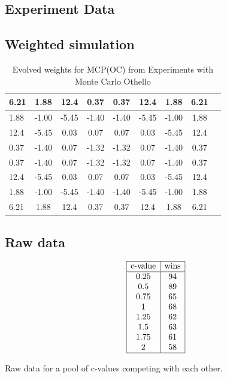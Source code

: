 \documentclass[
11pt, %
english, %
singlespacing, %
headsepline, %
]{MastersDoctoralThesis} %
\begin{document}
\printbibliography
\begin{appendices}
\chapter{Experiment Data}
\section{Weighted simulation}

\begin{table}[H]
	\centering
	\begin{tabular}{|l|c|c|c|c|c|c|c|c|}
		\hline
		6.21 &  1.88 &  12.4 &  0.37 &  0.37 & 12.4  &  1.88 & 6.21 \\
		\hline
		1.88 & -1.00 & -5.45 & -1.40 & -1.40 & -5.45 & -1.00 & 1.88 \\
		\hline
		12.4 & -5.45 &  0.03 &  0.07 &  0.07 &  0.03 & -5.45 & 12.4 \\
		\hline
		0.37 & -1.40 &  0.07 & -1.32 & -1.32 &  0.07 & -1.40 & 0.37 \\
		\hline
		0.37 & -1.40 &  0.07 & -1.32 & -1.32 &  0.07 & -1.40 & 0.37 \\
		\hline
		12.4 & -5.45 &  0.03 &  0.07 &  0.07 &  0.03 & -5.45 & 12.4 \\
		\hline
		1.88 & -1.00 & -5.45 & -1.40 & -1.40 & -5.45 & -1.00 & 1.88 \\
		\hline
		6.21 &  1.88 & 12.4  &  0.37 &  0.37 & 12.4  &  1.88 & 6.21 \\
		\hline
	\end{tabular}
	\caption{Evolved weights for MCP(OC) from Experiments with Monte Carlo Othello\cite{hingston2007experiments}}
	\label{table:othello-weights}
\end{table}

\section{Raw data}
\begin{table}[H]
\[
\begin{array}{|c|c|}
    \hline
    \text{c-value} & \text{wins}\\
    \hline
	0.25 & 94 \\ 
	0.5 & 89 \\ 
	0.75 & 65 \\ 
	1 & 68 \\ 
	1.25 & 62 \\ 
	1.5 & 63 \\ 
	1.75 & 61 \\ 
	2 & 58 \\
	\hline
\end{array} 
\]
\caption{Raw data for a pool of c-values competing with each other.}
\label{table:results-rank-raw}
\end{table}


\end{appendices}
\end{document}
